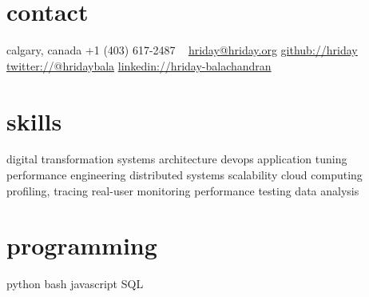 \begin{aside}
    \section{contact}
        calgary, canada
        +1 (403) 617-2487
        ~
        \href{mailto:hriday@hriday.org}{hriday@hriday.org}
        \href{https://github.com/hriday}{github://hriday}
        \href{https://twitter.com/hridaybala}{twitter://@hridaybala}
        \href{https://www.linkedin.com/in/hriday-balachandran}{linkedin://hriday-balachandran}
    \section{skills}
        digital transformation
	systems architecture
        devops 
	application tuning
        performance engineering
        distributed systems
        scalability
        cloud computing
        profiling, tracing
        real-user monitoring
        performance testing
        data analysis
        \section{programming}
        python
        bash
	javascript
	SQL
\end{aside}
